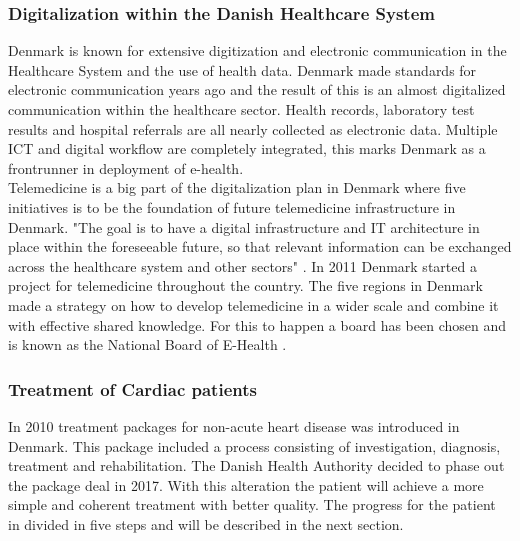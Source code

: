 \subsubsection{Digitalization within the Danish Healthcare System}

Denmark is known for extensive digitization and electronic communication in the Healthcare System and the use of health data. Denmark made standards for electronic communication years ago and the result of this is an almost digitalized communication within the healthcare sector. Health records, laboratory test results and hospital referrals are all nearly collected as electronic data. 
Multiple ICT and digital workflow are completely integrated, this marks Denmark as a frontrunner in deployment of e-health.\\
Telemedicine is a big part of the digitalization plan in Denmark where five initiatives is to be the foundation of future telemedicine infrastructure in Denmark. "The goal is to have a digital infrastructure and IT architecture in place within the foreseeable future, so that relevant information can be exchanged across the healthcare system and other sectors" \cite{Healthcareindk2}.
In 2011 Denmark started a project for telemedicine throughout the country. The five regions in Denmark made a strategy on how to develop telemedicine in a wider scale and combine it with effective shared knowledge. For this to happen a board has been chosen and is known as the National Board of E-Health \cite{DKhealthreview}. %



\subsubsection{Treatment of Cardiac patients}

In 2010 treatment packages for non-acute heart disease was introduced in Denmark. This package included a process consisting of investigation, diagnosis, treatment and rehabilitation. The Danish Health Authority decided to phase out the package deal in 2017. With this alteration the patient will achieve a more simple and coherent treatment with better quality. 
The progress for the patient in divided in five steps and will be described in the next section. \\

